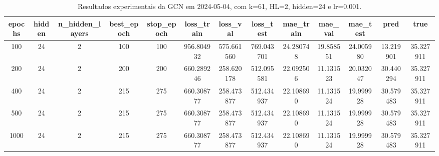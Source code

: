 \begin{table}[h]
\centering
\caption{Resultados experimentais da GCN em 2024-05-04, com k=61, HL=2, hidden=24 e lr=0.001.}
\label{tab:gcn_results_k61_hl2_h24_d20240504}
\begin{tabular}{ccccccccccccc}
\toprule
epochs & hidden & n\_hidden\_layers & best\_epoch & stop\_epoch & loss\_train & loss\_val & loss\_test & mae\_train & mae\_val & mae\_test & pred & true \\
\midrule
100 & 24 & 2 & 100 & 100 & 956.804932 & 575.661560 & 769.043701 & 24.280748 & 19.858551 & 24.005980 & 13.219901 & 35.327911 \\
200 & 24 & 2 & 200 & 200 & 660.289246 & 258.620178 & 512.095581 & 22.092506 & 11.131523 & 20.032047 & 30.440294 & 35.327911 \\
400 & 24 & 2 & 215 & 275 & 660.308777 & 258.473877 & 512.434937 & 22.108690 & 11.131524 & 19.999928 & 30.579483 & 35.327911 \\
500 & 24 & 2 & 215 & 275 & 660.308777 & 258.473877 & 512.434937 & 22.108690 & 11.131524 & 19.999928 & 30.579483 & 35.327911 \\
1000 & 24 & 2 & 215 & 275 & 660.308777 & 258.473877 & 512.434937 & 22.108690 & 11.131524 & 19.999928 & 30.579483 & 35.327911 \\
\bottomrule
\end{tabular}
\end{table}

